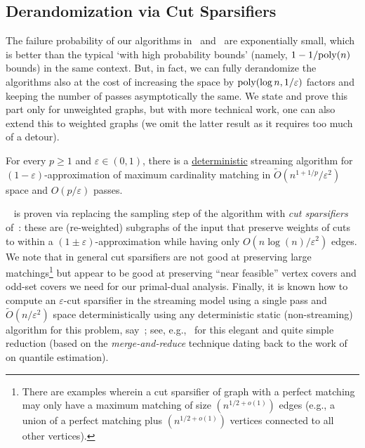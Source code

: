 \documentclass{article}
\renewcommand{\geq}{\geqslant}
\newcommand{\Ot}{\widetilde{O}}
\newcommand{\eps}{\varepsilon}
\newcommand{\poly}{\mbox{\rm poly}}
\begin{document}
\subsection{Derandomization via Cut Sparsifiers}\label{sec:ext-derandomization}

The failure probability of our algorithms in~ and~ are exponentially small, which is better than the typical `with high probability bounds' (namely, $1-1/\poly{(n)}$ bounds) in the same context. 
But, in fact, we can fully derandomize the algorithms also at the cost of increasing the space by $\poly(\log{n},1/\eps)$ factors and keeping the number of passes asymptotically the same. 
We state and prove this part only for unweighted graphs, but with more technical work, one can also extend this to weighted graphs (we omit the latter result as it requires too much of a detour). 

\begin{corollary}\label{cor:deterministic} For every  $p \geq 1$ and  $\eps \in (0,1)$, there is a \underline{deterministic} streaming algorithm for $(1-\eps)$-approximation of maximum cardinality matching
	in $\Ot(n^{1+1/p}/\eps^{2})$ space and $O(p/\eps)$ passes. 
\end{corollary}

~ is proven via replacing the sampling step of the algorithm with \emph{cut sparsifiers} of~\cite{BenczurK96}: these are (re-weighted) subgraphs of the input
that preserve weights of cuts to within a $(1\pm \eps)$-approximation while having only $O(n\log{\!(n)}/\eps^2)$ edges. We note that in general cut sparsifiers are not good at preserving large matchings\footnote{There are examples wherein a cut sparsifier of graph with a perfect matching may only have a 
maximum matching of size $(n^{1/2+o(1)})$ edges (e.g., a union of a perfect matching plus $(n^{1/2+o(1)})$ vertices connected to all other vertices).} but appear to be good at preserving ``near feasible'' vertex covers and odd-set covers 
we need for our primal-dual analysis. Finally, it is known how to compute an $\eps$-cut sparsifier in the streaming model using a single pass and $\Ot(n/\eps^2)$ space deterministically using any deterministic static (non-streaming)
algorithm for this problem, say~\cite{BatsonSS09}; see, e.g.,~\cite{McGregor14} for this elegant and quite simple reduction (based on the \emph{merge-and-reduce} technique dating back to the work of~\cite{RajagopalanML98} on quantile estimation).  
\end{document}
